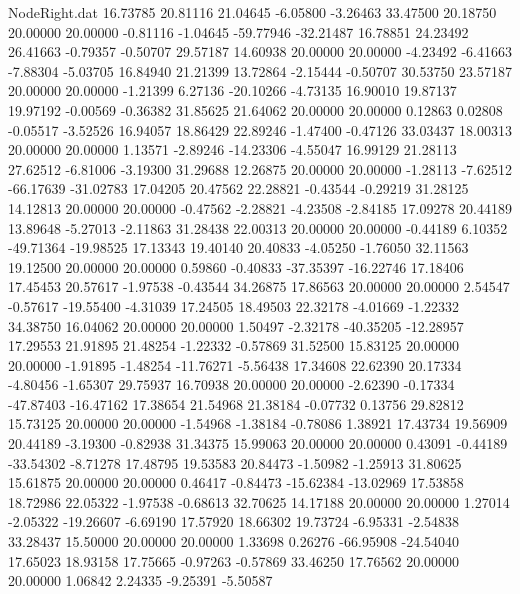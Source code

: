 \begin{filecontents}{NodeRight.dat}
  16.73785   20.81116   21.04645    -6.05800   -3.26463   33.47500   20.18750   20.00000   20.00000   -0.81116   -1.04645  -59.77946  -32.21487
  16.78851   24.23492   26.41663    -0.79357   -0.50707   29.57187   14.60938   20.00000   20.00000   -4.23492   -6.41663   -7.88304   -5.03705
  16.84940   21.21399   13.72864    -2.15444   -0.50707   30.53750   23.57187   20.00000   20.00000   -1.21399    6.27136  -20.10266   -4.73135
  16.90010   19.87137   19.97192    -0.00569   -0.36382   31.85625   21.64062   20.00000   20.00000    0.12863    0.02808   -0.05517   -3.52526
  16.94057   18.86429   22.89246    -1.47400   -0.47126   33.03437   18.00313   20.00000   20.00000    1.13571   -2.89246  -14.23306   -4.55047
  16.99129   21.28113   27.62512    -6.81006   -3.19300   31.29688   12.26875   20.00000   20.00000   -1.28113   -7.62512  -66.17639  -31.02783
  17.04205   20.47562   22.28821    -0.43544   -0.29219   31.28125   14.12813   20.00000   20.00000   -0.47562   -2.28821   -4.23508   -2.84185
  17.09278   20.44189   13.89648    -5.27013   -2.11863   31.28438   22.00313   20.00000   20.00000   -0.44189    6.10352  -49.71364  -19.98525
  17.13343   19.40140   20.40833    -4.05250   -1.76050   32.11563   19.12500   20.00000   20.00000    0.59860   -0.40833  -37.35397  -16.22746
  17.18406   17.45453   20.57617    -1.97538   -0.43544   34.26875   17.86563   20.00000   20.00000    2.54547   -0.57617  -19.55400   -4.31039
  17.24505   18.49503   22.32178    -4.01669   -1.22332   34.38750   16.04062   20.00000   20.00000    1.50497   -2.32178  -40.35205  -12.28957
  17.29553   21.91895   21.48254    -1.22332   -0.57869   31.52500   15.83125   20.00000   20.00000   -1.91895   -1.48254  -11.76271   -5.56438
  17.34608   22.62390   20.17334    -4.80456   -1.65307   29.75937   16.70938   20.00000   20.00000   -2.62390   -0.17334  -47.87403  -16.47162
  17.38654   21.54968   21.38184    -0.07732    0.13756   29.82812   15.73125   20.00000   20.00000   -1.54968   -1.38184   -0.78086    1.38921
  17.43734   19.56909   20.44189    -3.19300   -0.82938   31.34375   15.99063   20.00000   20.00000    0.43091   -0.44189  -33.54302   -8.71278
  17.48795   19.53583   20.84473    -1.50982   -1.25913   31.80625   15.61875   20.00000   20.00000    0.46417   -0.84473  -15.62384  -13.02969
  17.53858   18.72986   22.05322    -1.97538   -0.68613   32.70625   14.17188   20.00000   20.00000    1.27014   -2.05322  -19.26607   -6.69190
  17.57920   18.66302   19.73724    -6.95331   -2.54838   33.28437   15.50000   20.00000   20.00000    1.33698    0.26276  -66.95908  -24.54040
  17.65023   18.93158   17.75665    -0.97263   -0.57869   33.46250   17.76562   20.00000   20.00000    1.06842    2.24335   -9.25391   -5.50587

\end{filecontents}
